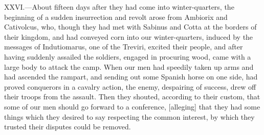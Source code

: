 XXVI.—About fifteen days after they had come into winter-quarters, the
beginning of a sudden insurrection and revolt arose from Ambiorix and
Cativolcus, who, though they had met with Sabinus and Cotta at the
borders of their kingdom, and had conveyed corn into our winter-quarters,
induced by the messages of Indutiomarus, one of the Treviri,
excited their people, and after having suddenly assailed the soldiers,
engaged in procuring wood, came with a large body to attack the camp.
When our men had speedily taken up arms and had ascended the rampart,
and sending out some Spanish horse on one side, had proved conquerors in
a cavalry action, the enemy, despairing of success, drew off their
troops from the assault. Then they shouted, according to their custom,
that some of our men should go forward to a conference, [alleging] that
they had some things which they desired to say respecting the common
interest, by which they trusted their disputes could be removed.

